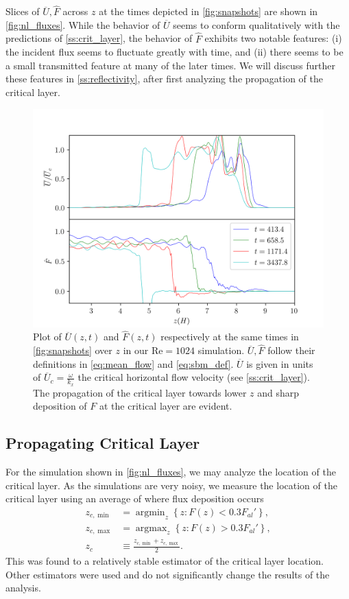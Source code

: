 \documentclass[
        fleqn,
        usenatbib,
    ]{mnras}
\newcommand*{\z}[1]{\left\{#1\right\}}
\DeclareMathOperator*{\argmin}{argmin}
\DeclareMathOperator*{\argmax}{argmax}
\begin{document}
Slices of $\overline{U}, \hat{F}$ across $z$ at the times depicted in
\autoref{fig:snapshots} are shown in \autoref{fig:nl_fluxes}. While the behavior
of $\overline{U}$ seems to conform qualitatively with the predictions of
\autoref{ss:crit_layer}, the behavior of $\hat{F}$ exhibits two notable
features: (i) the incident flux seems to fluctuate greatly with time, and (ii)
there seems to be a small transmitted feature at many of the later times. We
will discuss further these features in \autoref{ss:reflectivity}, after first
analyzing the propagation of the critical layer.
\begin{figure}
    \centering
    \includegraphics[width=\columnwidth]{plots/nl_fluxes.png}
    \caption{Plot of $\overline{U}(z, t)$ and $\hat{F}(z, t)$ respectively at
    the same times in \autoref{fig:snapshots} over $z$ in our $\mathrm{Re} =
    1024$ simulation. $\overline{U}, \hat{F}$ follow their definitions in
    \autoref{eq:mean_flow} and \autoref{eq:sbm_def}. $\overline{U}$ is given in
    units of $\overline{U}_c = \frac{\omega}{k_{x}}$ the critical horizontal
    flow velocity (see \autoref{ss:crit_layer}). The propagation of the critical
    layer towards lower $z$ and sharp deposition of $F$ at the critical layer
    are evident.}\label{fig:nl_fluxes}
\end{figure}

\subsection{Propagating Critical Layer}

For the simulation shown in \autoref{fig:nl_fluxes}, we may analyze the location
of the critical layer. As the simulations are very noisy, we measure the location
of the critical layer using an average of where flux deposition occurs
\begin{align}
    z_{c, \min} &= \argmin_z \z{z: F(z) < 0.3F_{al}'},\nonumber\\
    z_{c, \max} &= \argmax_z \z{z: F(z) > 0.3F_{al}'},\nonumber\\
    z_c &\equiv \frac{z_{c, \min} + z_{c, \max}}{2}.\label{eq:zc_def}
\end{align}
This was found to a relatively stable estimator of the critical layer location.
Other estimators were used and do not significantly change the results of the
analysis.
\end{document}
